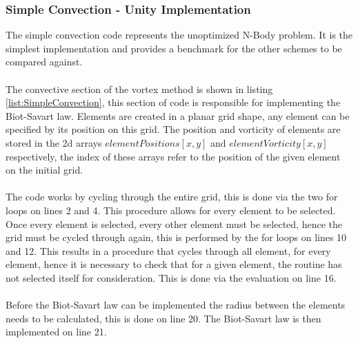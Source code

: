 \subsubsection{Simple Convection - Unity Implementation}
The simple convection code represents the unoptimized N-Body problem. It is the simplest implementation and provides a benchmark for the other schemes to be compared against.
\\\\
The convective section of the vortex method is shown in listing \ref{list:SimpleConvection}, this section of code is responsible for implementing the Biot-Savart law. Elements are created in a planar grid shape, any element can be specified by its position on this grid. The position and vorticity of elements are stored in the 2d arrays $elementPositions[x,y]$ and $elementVorticity[x,y]$ respectively, the index of these arrays refer to the position of the given element on the initial grid.
\\\\
The code works by cycling through the entire grid, this is done via the two for loops on lines 2 and 4. This procedure allows for every element to be selected. Once every element is selected, every other element must be selected, hence the grid must be cycled through again, this is performed by the for loops on lines 10 and 12. This results in a procedure that cycles through all element, for every element, hence it is necessary to check that for a given element, the routine has not selected itself for consideration. This is done via the evaluation on line 16.
\\\\
Before the Biot-Savart law can be implemented the radius between the elements needs to be calculated, this is done on line 20. The Biot-Savart law is then implemented on line 21.


